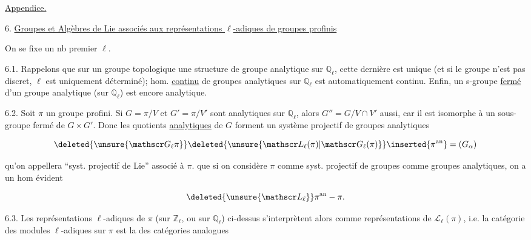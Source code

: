\uline{Appendice.}

6. \uline{Groupes et Algèbres de Lie  associés aux représentations $\ell$-adiques de groupes profinis}

On se fixe un nb premier $\ell$.

6.1. Rappelons que sur un groupe topologique  une structure de groupe analytique sur $\mathbb Q_\ell$, cette dernière est unique (et si le groupe n'est pas discret, $\ell$ est uniquement déterminé);    hom. \uline{continu} de groupes analytiques sur $\mathbb Q_\ell$ est automatiquement continu. Enfin, un s-groupe \uline{fermé} d'un groupe analytique (sur $\mathbb Q_\ell$) est encore analytique.

6.2. Soit  $\pi$ un groupe profini. Si $G=\pi/V$ et $G'=\pi/V'$ sont analytiques sur $\mathbb Q_\ell$, alors $G''=G/V\cap V'$ aussi, car il  est isomorphe à un sous-groupe fermé de $G\times G'$. Donc les  quotients \uline{analytiques} de $G$ forment un système projectif de groupes analytiques

\[
\deleted{\unsure{\mathscr G_\ell\pi}}\deleted{\unsure{\mathscr L_\ell(\pi)|\mathscr G_\ell(\pi)}}\inserted{\pi^{\mathrm{an}}}=(G_\alpha)
\]

qu'on appellera ``syst. projectif de Lie'' associé à $\pi$.  que si on considère $\pi$ comme   syst. projectif de groupes  comme groupes analytiques, on a un hom évident

\[
\deleted{\unsure{\mathscr L_\ell}}\pi^{\mathrm{an}}\mathbin{-}\pi.
\]

6.3. Les représentations $\ell$-adiques de $\pi$ (sur $\mathbb Z_\ell$, ou sur $\mathbb Q_\ell$) ci-dessus s'interprètent alors comme représentations  de $\mathscr L_\ell(\pi)$, i.e. la catégorie des modules $\ell$-adiques sur $\pi$ est la  des catégories analogues
